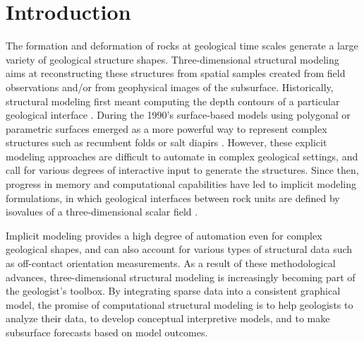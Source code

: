 \documentclass[final]{ring20}
\begin{document}
\section*{Introduction}

The formation and deformation of rocks at geological time scales generate a large variety of geological structure shapes. Three-dimensional structural modeling aims at reconstructing these structures from spatial samples created from field observations and/or from geophysical images of the subsurface. Historically, structural modeling first meant computing the depth contours of a particular geological interface \citep[e.g.,][]{Walters1969AB,Hardy1971JGR,Briggs1974G,Bolondi1976G}. During the 1990's surface-based models using polygonal or parametric surfaces emerged as a more powerful way to represent complex structures such as recumbent folds or salt diapirs \citep{Mallet1992CD,deKemp1999CG}. However, these explicit modeling approaches are difficult to automate in complex geological settings, and call for various degrees of interactive input to generate the structures. Since then, progress in memory and computational capabilities have led to implicit modeling formulations, in which geological interfaces between rock units are defined by isovalues of a three-dimensional scalar field \citep{Lajaunie1997MG,Cowan2002ASGMEM,Calcagno2008PEPI,Frank2007CG,Caumon2013GaRSITo,Souche20137ECEISE2,Hillier2014MG,Laurent2016MG,Laurent2016EaPSL,Martin2017CG,Grose2017JSG,delaVarga2018GMDD,Irakarama2018EAGE,Grose2019JoSG,Renaudeau2019BEMRMX,Renaudeau2019MG,Manchuk2019CG}.

Implicit modeling provides a high degree of automation even for complex geological shapes, and can also account for various types of structural data such as off-contact orientation  measurements. As a result of these methodological advances, three-dimensional structural modeling is increasingly becoming part of the geologist's toolbox. By integrating sparse data into a consistent graphical model, the promise of computational structural modeling is to help geologists to analyze their data, to develop conceptual interpretive models, and to make subsurface forecasts based on model outcomes. 
\end{document}

